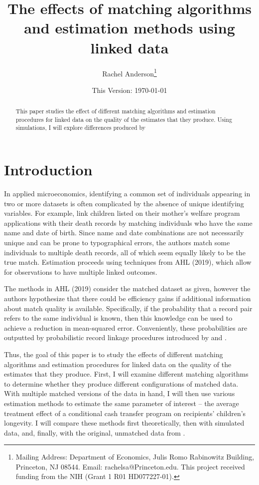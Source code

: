 \documentclass[12pt]{article}
\title{\singlespacing The effects of matching algorithms and estimation methods using linked data}
\author{Rachel Anderson\thanks{Mailing Address: Department of Economics, Julis Romo Rabinowitz Building,
Princeton, NJ 08544. Email: rachelsa@Princeton.edu.
This project received funding from the NIH (Grant 1 R01 HD077227-01). }}
\date{This Version: \today}
\begin{document}
\maketitle


\begin{abstract}
\singlespacing
\noindent This paper studies the effect of different matching algorithms and estimation procedures for linked data on the quality of the estimates that they produce.  Using simulations, I will explore differences produced by  
\end{abstract}

\section{Introduction}
In applied microeconomics, identifying a common set of individuals appearing in two or more datasets is often complicated by the absence of unique identifying variables. For example,  \cite{CITE HERE} link children listed on their mother's welfare program applications with their death records by matching individuals who have the same name and date of birth.  Since name and date combinations are not necessarily unique and can be prone to typographical errors, the authors match some individuals to multiple death records, all of which seem equally likely to be the true match.  Estimation proceeds using techniques from AHL (2019), which allow for observations to have multiple linked outcomes.  

The methods in AHL (2019) consider the matched dataset as given, however the authors hypothesize that there could be efficiency gains if additional information about match quality is available.  Specifically, if the probability that a record pair refers to the same individual is known, then this knowledge can be used to achieve a reduction in mean-squared error.  Conveniently, these probabilities are outputted by probabilistic record linkage procedures introduced by \cite{FellegiSunter} and \cite{Newcome}. 

Thus, the goal of this paper is to study the effects of different matching algorithms and estimation procedures for linked data on the quality of the estimates that they produce.  First, I will examine different matching algorithms to determine whether they produce different configurations of matched data.  With multiple matched versions of the data in hand, I will then use various estimation methods to estimate the same parameter of interest -- the average treatment effect of a conditional cash transfer program on recipients' children's longevity.   I will compare these methods first theoretically, then with simulated data, and, finally, with the original, unmatched data from \cite{}.   
\end{document}
